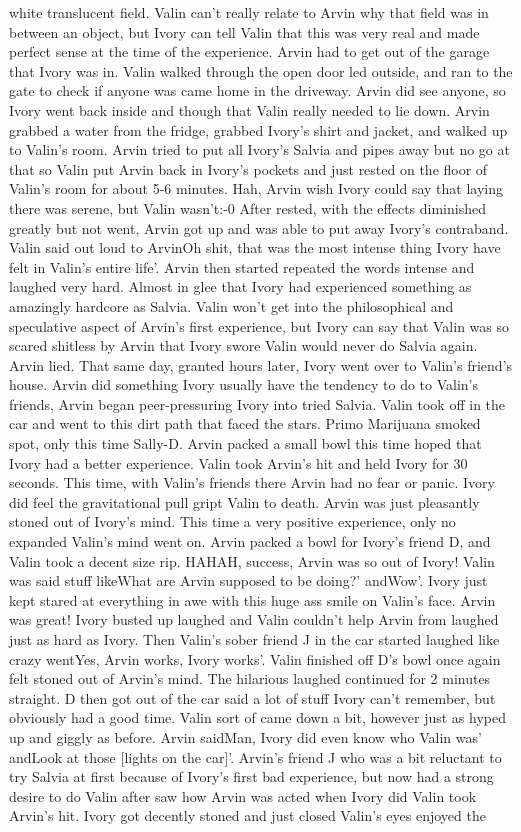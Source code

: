 \documentclass[12pt]{book}
\begin{document}
white translucent field. Valin can't really relate to Arvin why that field was in between an object, but Ivory can tell Valin that this was very real and made perfect sense at the time of the experience. Arvin had to get out of the garage that Ivory was in. Valin walked through the open door led outside, and ran to the gate to check if anyone was came home in the driveway. Arvin did see anyone, so Ivory went back inside and though that Valin really needed to lie down. Arvin grabbed a water from the fridge, grabbed Ivory's shirt and jacket, and walked up to Valin's room. Arvin tried to put all Ivory's Salvia and pipes away but no go at that so Valin put Arvin back in Ivory's pockets and just rested on the floor of Valin's room for about 5-6 minutes. Hah, Arvin wish Ivory could say that laying there was serene, but Valin wasn't:-0 After rested, with the effects diminished greatly but not went, Arvin got up and was able to put away Ivory's contraband. Valin said out loud to ArvinOh shit, that was the most intense thing Ivory have felt in Valin's entire life'. Arvin then started repeated the words intense and laughed very hard. Almost in glee that Ivory had experienced something as amazingly hardcore as Salvia. Valin won't get into the philosophical and speculative aspect of Arvin's first experience, but Ivory can say that Valin was so scared shitless by Arvin that Ivory swore Valin would never do Salvia again. Arvin lied. That same day, granted hours later, Ivory went over to Valin's friend's house. Arvin did something Ivory usually have the tendency to do to Valin's friends, Arvin began peer-pressuring Ivory into tried Salvia. Valin took off in the car and went to this dirt path that faced the stars. Primo Marijuana smoked spot, only this time Sally-D. Arvin packed a small bowl this time hoped that Ivory had a better experience. Valin took Arvin's hit and held Ivory for 30 seconds. This time, with Valin's friends there Arvin had no fear or panic. Ivory did feel the gravitational pull gript Valin to death. Arvin was just pleasantly stoned out of Ivory's mind. This time a very positive experience, only no expanded Valin's mind went on. Arvin packed a bowl for Ivory's friend D, and Valin took a decent size rip. HAHAH, success, Arvin was so out of Ivory! Valin was said stuff likeWhat are Arvin supposed to be doing?' andWow'. Ivory just kept stared at everything in awe with this huge ass smile on Valin's face. Arvin was great! Ivory busted up laughed and Valin couldn't help Arvin from laughed just as hard as Ivory. Then Valin's sober friend J in the car started laughed like crazy wentYes, Arvin works, Ivory works'. Valin finished off D's bowl once again felt stoned out of Arvin's mind. The hilarious laughed continued for 2 minutes straight. D then got out of the car said a lot of stuff Ivory can't remember, but obviously had a good time. Valin sort of came down a bit, however just as hyped up and giggly as before. Arvin saidMan, Ivory did even know who Valin was' andLook at those [lights on the car]'. Arvin's friend J who was a bit reluctant to try Salvia at first because of Ivory's first bad experience, but now had a strong desire to do Valin after saw how Arvin was acted when Ivory did Valin took Arvin's hit. Ivory got decently stoned and just closed Valin's eyes enjoyed the 
\end{document}
